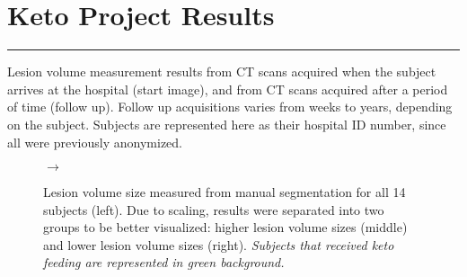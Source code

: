 



\section*{Keto Project Results}
	\vspace*{-0.4cm}\rule{10cm}{0.1mm}
	
	\Large{Lesion volume measurement results from CT scans acquired when the subject arrives at the hospital (start image), and from CT scans acquired after a period of time (follow up). Follow up acquisitions varies from weeks to years, depending on the subject. Subjects are represented here as their hospital ID number, since all were previously anonymized.} 
	
\begin{figure}[!h]
    \begin{minipage}{0.5\linewidth}
        \centering
        \begin{minipage}{0.25\linewidth}\hspace{-1cm}
            
        \end{minipage}
        \begin{minipage}{0.25\linewidth}\hspace{3.5cm}
            \Huge{$\rightarrow$}
        \end{minipage}
        \begin{minipage}{0.25\linewidth}
            
        \end{minipage}
        \begin{minipage}{0.25\linewidth}\vspace{-10.93cm}\hspace{15.5cm}
            
        \end{minipage}
    \end{minipage}\vspace{-0.5cm}
    \caption{Lesion volume size measured from manual segmentation for all 14 subjects (left). Due to scaling, results were separated into two groups to be better visualized: higher lesion volume sizes (middle) and lower lesion volume sizes (right). \emph{Subjects that received keto feeding are represented in green background.}}
\end{figure}

